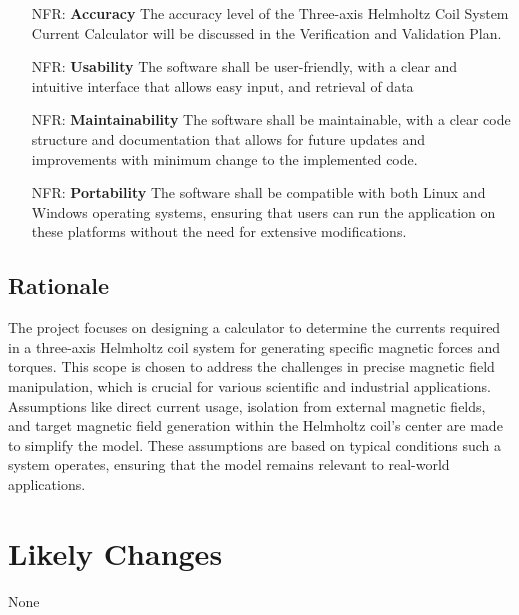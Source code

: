 \documentclass[12pt]{article}
\newcounter{nfrnum} %
\begin{document}
\noindent \begin{itemize}

\item[NFR\refstepcounter{nfrnum}\thenfrnum \label{NFR_Accuracy}:]
  \textbf{Accuracy}{ The accuracy level of the Three-axis Helmholtz Coil System Current Calculator will be discussed in the Verification and Validation Plan.}

\item[NFR\refstepcounter{nfrnum}\thenfrnum \label{NFR_Usability}:]
 \textbf{Usability}{ The software shall be user-friendly, with a clear and intuitive interface that allows easy input, and retrieval of data}

\item[NFR\refstepcounter{nfrnum}\thenfrnum \label{NFR_Maintainability}:]
  \textbf{Maintainability}{ The software shall be maintainable, with a clear code structure and documentation that allows for future updates and improvements with minimum change to the implemented code.}

\item[NFR\refstepcounter{nfrnum}\thenfrnum \label{NFR_Portability}:]
  \textbf{Portability}{ The software shall be compatible with both Linux and Windows operating systems, ensuring that users can run the application on these platforms without the need for extensive modifications. }


\end{itemize}

\subsection{Rationale}
{
The project focuses on designing a calculator to determine the currents required in a three-axis Helmholtz coil system for generating specific magnetic forces and torques. This scope is chosen to address the challenges in precise magnetic field manipulation, which is crucial for various scientific and industrial applications. Assumptions like direct current usage, isolation from external magnetic fields, and target magnetic field generation within the Helmholtz coil's center are made to simplify the model. These assumptions are based on typical conditions such a system operates, ensuring that the model remains relevant to real-world applications.
}
\section{Likely Changes}    


None
\end{document}
